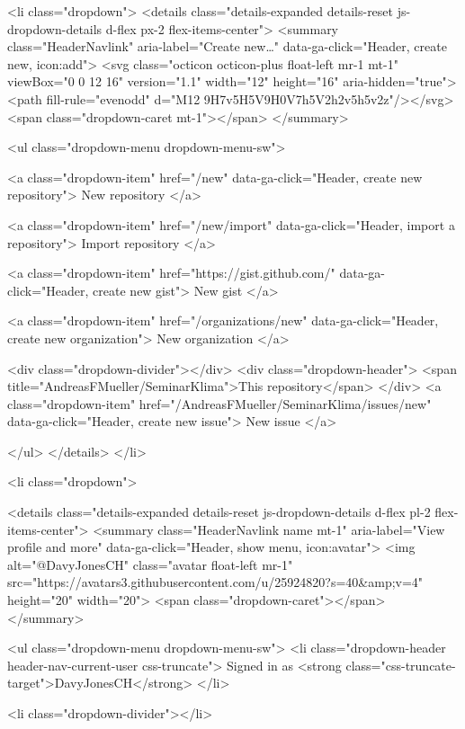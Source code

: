   <li class="dropdown">
    <details class="details-expanded details-reset js-dropdown-details d-flex px-2 flex-items-center">
      <summary class="HeaderNavlink"
         aria-label="Create new…"
         data-ga-click="Header, create new, icon:add">
        <svg class="octicon octicon-plus float-left mr-1 mt-1" viewBox="0 0 12 16" version="1.1" width="12" height="16" aria-hidden="true"><path fill-rule="evenodd" d="M12 9H7v5H5V9H0V7h5V2h2v5h5v2z"/></svg>
        <span class="dropdown-caret mt-1"></span>
      </summary>

      <ul class="dropdown-menu dropdown-menu-sw">
        
<a class="dropdown-item" href="/new" data-ga-click="Header, create new repository">
  New repository
</a>

  <a class="dropdown-item" href="/new/import" data-ga-click="Header, import a repository">
    Import repository
  </a>

<a class="dropdown-item" href="https://gist.github.com/" data-ga-click="Header, create new gist">
  New gist
</a>

  <a class="dropdown-item" href="/organizations/new" data-ga-click="Header, create new organization">
    New organization
  </a>



  <div class="dropdown-divider"></div>
  <div class="dropdown-header">
    <span title="AndreasFMueller/SeminarKlima">This repository</span>
  </div>
    <a class="dropdown-item" href="/AndreasFMueller/SeminarKlima/issues/new" data-ga-click="Header, create new issue">
      New issue
    </a>

      </ul>
    </details>
  </li>

  <li class="dropdown">

    <details class="details-expanded details-reset js-dropdown-details d-flex pl-2 flex-items-center">
      <summary class="HeaderNavlink name mt-1"
        aria-label="View profile and more"
        data-ga-click="Header, show menu, icon:avatar">
        <img alt="@DavyJonesCH" class="avatar float-left mr-1" src="https://avatars3.githubusercontent.com/u/25924820?s=40&amp;v=4" height="20" width="20">
        <span class="dropdown-caret"></span>
      </summary>

      <ul class="dropdown-menu dropdown-menu-sw">
        <li class="dropdown-header header-nav-current-user css-truncate">
          Signed in as <strong class="css-truncate-target">DavyJonesCH</strong>
        </li>

        <li class="dropdown-divider"></li>

